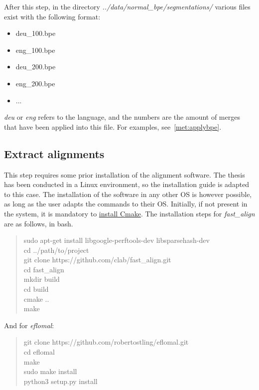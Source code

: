 After this step, in the directory \emph{../data/normal\_bpe/segmentations/} various files exist with the following format:

\begin{itemize}
  \item deu\_100.bpe
  \item eng\_100.bpe
  \item deu\_200.bpe
  \item eng\_200.bpe
  \item ...
\end{itemize}

\emph{deu} or \emph{eng} refers to the language, and the numbers are the amount of merges that have been applied into this file. For examples, see~\ref{met:applybpe}.

\subsection{Extract alignments}

This step requires some prior installation of the alignment software. The thesis has been conducted in a Linux environment, so the installation guide is adapted to this case. The installation of the software in any other OS is however possible, as long as the user adapts the commands to their OS. Initially, if not present in the system, it is mandatory to \href{https://cmake.org/install/}{install Cmake}. The installation steps for \emph{fast\_align} are as follows, in bash.

\begin{quote}
  sudo apt-get install libgoogle-perftools-dev libsparsehash-dev\\
  cd ../path/to/project\\
  git clone https://github.com/clab/fast\_align.git\\
  cd fast\_align\\
  mkdir build\\
  cd build\\
  cmake ..\\
  make
\end{quote}

And for \emph{eflomal}:

\begin{quote}
  git clone https://github.com/robertostling/eflomal.git\\
  cd eflomal\\
  make\\
  sudo make install\\
  python3 setup.py install
\end{quote}


